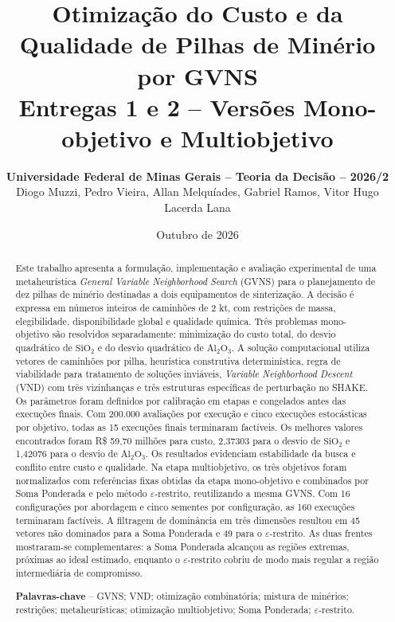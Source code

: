 \documentclass[10pt,twocolumn,a4paper]{article}
\title{\LARGE \textbf{Otimização do Custo e da Qualidade de Pilhas de Minério por GVNS}\\[0.3em]
\large Entregas 1 e 2 -- Versões Mono-objetivo e Multiobjetivo}
\author{\textbf{Universidade Federal de Minas Gerais -- Teoria da Decisão -- 2026/2}\\[0.2em]
\small Diogo Muzzi, Pedro Vieira, Allan Melquíades, Gabriel Ramos, Vitor Hugo Lacerda Lana}
\date{Outubro de 2026}
\begin{document}
\maketitle

\begin{abstract}
\noindent Este trabalho apresenta a formulação, implementação e avaliação experimental de uma metaheurística \textit{General Variable Neighborhood Search} (GVNS) para o planejamento de dez pilhas de minério destinadas a dois equipamentos de sinterização. A decisão é expressa em números inteiros de caminhões de 2 kt, com restrições de massa, elegibilidade, disponibilidade global e qualidade química. Três problemas mono-objetivo são resolvidos separadamente: minimização do custo total, do desvio quadrático de $\text{SiO}_2$ e do desvio quadrático de $\text{Al}_2\text{O}_3$. A solução computacional utiliza vetores de caminhões por pilha, heurística construtiva determinística, regra de viabilidade para tratamento de soluções inviáveis, \textit{Variable Neighborhood Descent} (VND) com três vizinhanças e três estruturas específicas de perturbação no SHAKE. Os parâmetros foram definidos por calibração em etapas e congelados antes das execuções finais. Com 200.000 avaliações por execução e cinco execuções estocásticas por objetivo, todas as 15 execuções finais terminaram factíveis. Os melhores valores encontrados foram R\$ 59,70 milhões para custo, 2,37303 para o desvio de $\text{SiO}_2$ e 1,42076 para o desvio de $\text{Al}_2\text{O}_3$. Os resultados evidenciam estabilidade da busca e conflito entre custo e qualidade. Na etapa multiobjetivo, os três objetivos foram normalizados com referências fixas obtidas da etapa mono-objetivo e combinados por Soma Ponderada e pelo método $\varepsilon$-restrito, reutilizando a mesma GVNS. Com 16 configurações por abordagem e cinco sementes por configuração, as 160 execuções terminaram factíveis. A filtragem de dominância em três dimensões resultou em 45 vetores não dominados para a Soma Ponderada e 49 para o $\varepsilon$-restrito. As duas frentes mostraram-se complementares: a Soma Ponderada alcançou as regiões extremas, próximas ao ideal estimado, enquanto o $\varepsilon$-restrito cobriu de modo mais regular a região intermediária de compromisso.

\vspace{0.3em}
\noindent\textbf{Palavras-chave} -- GVNS; VND; otimização combinatória; mistura de minérios; restrições; metaheurísticas; otimização multiobjetivo; Soma Ponderada; $\varepsilon$-restrito.
\end{abstract}
\end{document}

